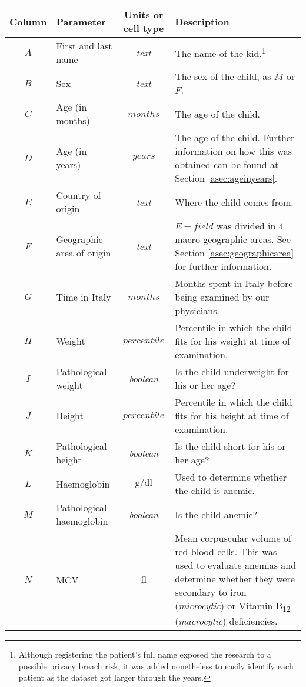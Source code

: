 \begin{footnotesize}
	\centering
	\begin{longtable}{C{.09\mylength} p{.25\mylength} C{.20\mylength} p{.40\mylength}}
		Column & Parameter & Units or cell type & Description\\
		\hline
		$A$ & First and last name & \textit{text} & The name of the kid.\footnote{Although registering the patient's full name exposed the research to a possible privacy breach risk, it was added nonetheless to easily identify each patient as the dataset got larger through the years.}\\
		$B$ & Sex & \textit{text} & The sex of the child, as $M$ or $F$.\\
		$C$ & Age (in months) & $months$ & The age of the child.\\
		$D$ & Age (in years) & $years$ & The age of the child. Further information on how this was obtained can be found at Section \ref{asec:ageinyears}.\\
		$E$ & Country of origin & \textit{text} & Where the child comes from.\\
		$F$ & Geographic area of origin & \textit{text} & $E-field$ was divided in 4 macro-geographic areas. See Section \ref{asec:geographicarea} for further information.\\
		$G$ & Time in Italy & $months$ &  Months spent in Italy before being examined by our physicians.\\
		$H$ & Weight & $percentile$ & Percentile in which the child fits for his weight at time of examination.\\
		$I$ & Pathological weight & \textit{boolean} & Is the child underweight for his or her age?\\
		$J$ & Height & $percentile$ & Percentile in which the child fits for his height at time of examination.\\
		$K$ & Pathological height & \textit{boolean} & Is the child short for his or her age?\\
		$L$ & Haemoglobin & $\si{\gram}/\si{\deci\litre}$ & Used to determine whether the child is anemic.\\
		$M$ & Pathological haemoglobin & \textit{boolean} & Is the child anemic?\\
		$N$ & MCV & $\si{\femto\litre}$ & Mean corpuscular volume of red blood cells. This was used to evaluate anemias and determine whether they were secondary to iron (\textit{microcytic}) or Vitamin B\textsubscript{12} (\textit{macrocytic}) deficiencies.\\

\end{longtable}
\end{footnotesize}
